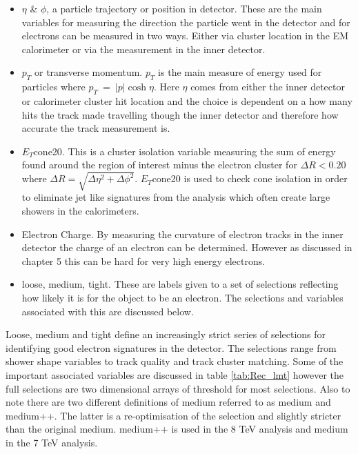 	\begin{itemize}
	\item $\eta$ \& $\phi$, a particle trajectory or position in detector. These are the main variables for measuring the direction the particle went in the detector and for electrons can be measured in two ways. Either via cluster location in the EM calorimeter or via the measurement in the inner detector.
	\item $p_{T}$ or transverse momentum. $p_{T}$ is the main measure of energy used for particles where $p_{T}~=~|p|\cosh{\eta}$. Here $\eta$ comes from either the inner detector or calorimeter cluster hit location and the choice is dependent on a how many hits the track made travelling though the inner detector and therefore how accurate the track measurement is.
	\item $E_{T}$cone20. This is a cluster isolation variable measuring the sum of energy found around the region of interest minus the electron cluster for $\Delta R < 0.20$ where $\Delta R = \sqrt{\Delta\eta^{2} + \Delta\phi^{2}}$. $E_{T}$cone20 is used to check cone isolation in order to eliminate jet like signatures from the analysis which often create large showers in the calorimeters.
	\item Electron Charge. By measuring the curvature of electron tracks in the inner detector the charge of an electron can be determined. However as discussed in chapter 5 this can be hard for very high energy electrons.
	\item loose, medium, tight. These are labels given to a set of selections reflecting how likely it is for the object to be an electron. The selections and variables associated with this are discussed below.
	\end{itemize}

	Loose, medium and tight define an increasingly strict series of selections for identifying good electron signatures in the detector. The selections range from shower shape variables to track quality and track cluster matching. Some of the important associated variables are discussed in table \ref{tab:Rec_lmt} however the full selections are two dimensional arrays of threshold for most selections. Also to note there are two different definitions of medium referred to as medium and medium++. The latter is a re-optimisation of the selection and slightly stricter than the original medium. medium++ is used in the 8 TeV analysis and medium in the 7 TeV analysis.

